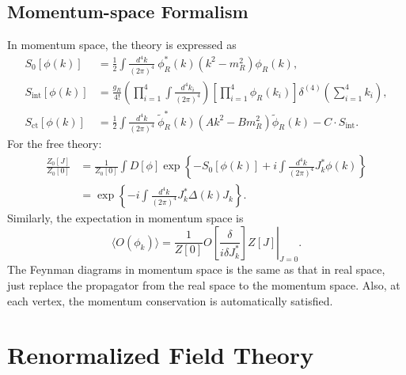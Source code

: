 \subsection{Momentum-space Formalism}
In momentum space, the theory is expressed as
\begin{equation}
\begin{aligned}
	S_0[\phi(k)] &= \frac{1}{2} \int\frac{d^4 k}{(2\pi)^4}\ \phi_R^*(k)(k^2-m_R^2) \phi_R(k), \\
	S_\mathrm{int}[\phi(k)] &= \frac{g_R}{4!} \left(\prod_{i=1}^{4} \int \frac{d^4 k_i}{(2\pi)^4} \right) \left[\prod_{i=1}^4 \phi_R(k_i)\right] \delta^{(4)}\left(\sum_{i=1}^4 k_i\right), \\
	S_{\mathrm{ct}}[\phi(k)] &= \frac{1}{2} \int\frac{d^4 k}{(2\pi)^4}\ \tilde\phi_R^*(k)(A k^2 - B m_R^2) \tilde\phi_R(k) - C \cdot S_\mathrm{int}.
\end{aligned}
\end{equation}
For the free theory:
\begin{equation}
\begin{aligned}
	\frac{Z_0[J]}{Z_0[0]} &= \frac{1}{Z_0[0]}\int D[\phi] \exp\left\{ -S_0[\phi(k)] + i \int\frac{d^4 k}{(2\pi)^4} J_k^* \phi(k) \right\} \\
	&= \exp\left\{ -i \int\frac{d^4 k}{(2\pi)^4} J^*_k \Delta(k) J_k \right\}.
\end{aligned}
\end{equation}
Similarly, the expectation in momentum space is
\begin{equation}
	\langle O(\phi_k)\rangle
	= \frac{1}{Z[0]} \left. O\left[\frac{\delta}{i\delta J^*_k}\right] Z[J] \right|_{J=0}.
\end{equation}
The Feynman diagrams in momentum space is the same as that in real space, just replace the propagator from the real space to the momentum space.
Also, at each vertex, the momentum conservation is automatically satisfied.


\section{Renormalized Field Theory}

